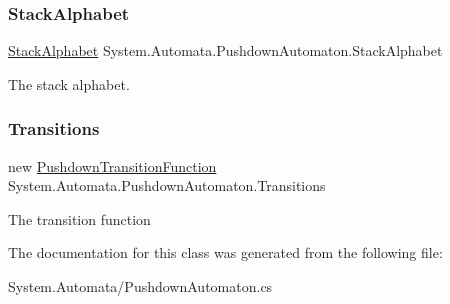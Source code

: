 \subsubsection{\texorpdfstring{Stack\+Alphabet}{StackAlphabet}}
{\footnotesize\ttfamily \mbox{\hyperlink{class_system_1_1_automata_1_1_stack_alphabet}{Stack\+Alphabet}} System.\+Automata.\+Pushdown\+Automaton.\+Stack\+Alphabet\hspace{0.3cm}{\ttfamily [get]}}



The stack alphabet. 

\mbox{\label{class_system_1_1_automata_1_1_pushdown_automaton_a2f4b67078bb3b628ff512fc5db396269}} 
\subsubsection{\texorpdfstring{Transitions}{Transitions}}
{\footnotesize\ttfamily new \mbox{\hyperlink{class_system_1_1_automata_1_1_pushdown_transition_function}{Pushdown\+Transition\+Function}} System.\+Automata.\+Pushdown\+Automaton.\+Transitions\hspace{0.3cm}{\ttfamily [get]}}



The transition function 



The documentation for this class was generated from the following file\+:\begin{DoxyCompactItemize}
\item 
System.\+Automata/Pushdown\+Automaton.\+cs\end{DoxyCompactItemize}
